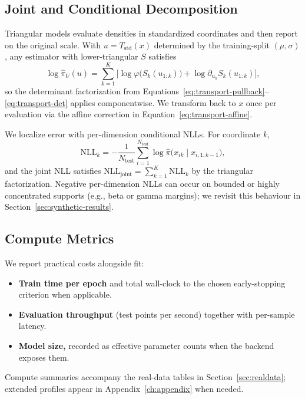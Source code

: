 \documentclass[11pt,a4paper,twoside]{book}\usepackage[]{graphicx}\usepackage[]{xcolor}
\begin{document}
\subsection{Joint and Conditional Decomposition}

Triangular models evaluate densities in standardized coordinates and then report on the original scale. With $u = T_{\mathrm{std}}(x)$ determined by the training-split $(\mu, \sigma)$, any estimator with lower-triangular $S$ satisfies
\begin{equation}
  \log \hat{\pi}_U(u) = \sum_{k=1}^{K} \Big[ \log \varphi\big(S_k(u_{1:k})\big) + \log \partial_{u_k} S_k(u_{1:k}) \Big],
  \label{eq:evaluation-triangular}
\end{equation}
so the determinant factorization from Equations~\eqref{eq:transport-pullback}--\eqref{eq:transport-det} applies componentwise. We transform back to $x$ once per evaluation via the affine correction in Equation~\eqref{eq:transport-affine}.

We localize error with per-dimension conditional NLLs. For coordinate $k$,
\begin{equation}
  \mathrm{NLL}_k = -\frac{1}{N_{\mathrm{test}}} \sum_{i=1}^{N_{\mathrm{test}}} \log \hat{\pi}\big(x_{ik} \mid x_{i,1:k-1}\big),
  \label{eq:evaluation-conditional-nll}
\end{equation}
and the joint NLL satisfies $\mathrm{NLL}_{\mathrm{joint}} = \sum_{k=1}^{K} \mathrm{NLL}_k$ by the triangular factorization. Negative per-dimension NLLs can occur on bounded or highly concentrated supports (e.g., beta or gamma margins); we revisit this behaviour in Section~\ref{sec:synthetic-results}.

\subsection{Compute Metrics}

We report practical costs alongside fit:
\begin{itemize}
  \item \textbf{Train time per epoch} and total wall-clock to the chosen early-stopping criterion when applicable.
  \item \textbf{Evaluation throughput} (test points per second) together with per-sample latency.
  \item \textbf{Model size,} recorded as effective parameter counts when the backend exposes them.
\end{itemize}
Compute summaries accompany the real-data tables in Section~\ref{sec:realdata}; extended profiles appear in Appendix~\ref{ch:appendix} when needed.
\end{document}
